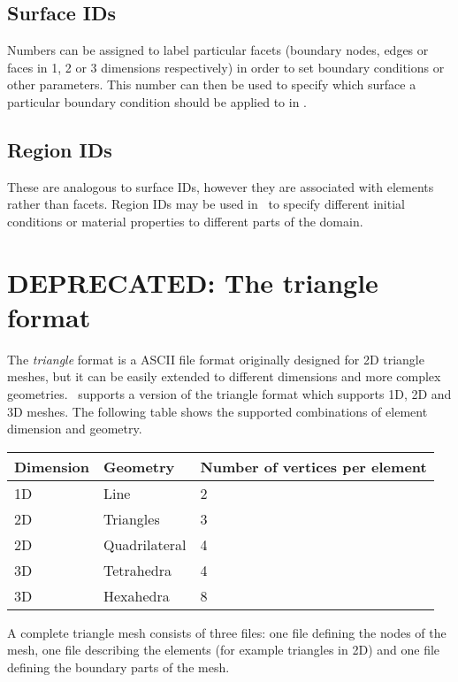 \subsection{Surface IDs}\label{sec:surface_ids}
Numbers can be assigned to label particular facets (boundary nodes, edges or
faces in 1, 2 or 3 dimensions respectively) in order to set
boundary conditions or other parameters. This number can then be used to
specify which surface a particular boundary condition should be applied to
in \fluidity. 

\subsection{Region IDs}\label{sec:region_ids}
 These are analogous to surface IDs, however they are
associated with elements rather than facets. Region IDs may be used in
\fluidity\ to specify different initial conditions or material properties to
different parts of the domain.



\section{DEPRECATED: The triangle format}\label{sec:triangle_format}

The \emph{triangle} format is a ASCII file format originally designed for 2D
triangle meshes, but it can be easily extended to different dimensions and
more complex geometries.  \fluidity\ supports a version of the triangle format
which supports 1D, 2D and 3D meshes.  The following table shows the supported
combinations of element dimension and geometry.

\begin{tabular}{ l l l }
\textbf{Dimension} & \textbf{Geometry} & \textbf{Number of vertices per element} \\ \hline
1D & Line & 2\\ 
2D & Triangles &  3 \\ 
2D & Quadrilateral & 4 \\
3D & Tetrahedra & 4 \\ 
3D & Hexahedra & 8 \\
\end{tabular}

A complete triangle mesh consists of three files: one file defining the
nodes of the mesh, one file describing the elements (for example triangles
in 2D) and one file defining the boundary parts of the mesh.

